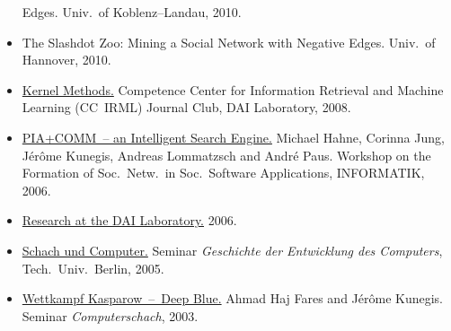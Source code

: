 \documentclass[line,mm]{res}
\newcounter{y}
\newcommand{\talknumber}{T\arabic{y}\stepcounter{y}}
\begin{document}
\begin{resume}
\begin{itemize}
    Edges. Univ.\ of Koblenz--Landau, 2010. 
  \item[{[\talknumber]}] The Slashdot Zoo: Mining a Social Network with Negative
    Edges. Univ.\ of Hannover, 2010. 
  \item[{[\talknumber]}]
    \href{https://github.com/kunegis/pdfs/blob/master/kunegis:kernels-club.presentation.pdf}{Kernel Methods.}
    Competence Center for Information Retrieval and Machine Learning (CC~IRML) Journal Club, DAI Laboratory, 2008. 
  \item[{[\talknumber]}] 
    \href{https://github.com/kunegis/pdfs/blob/master/hahne:gradualisiertes-communitymodell.presentation.pdf}{PIA+COMM~--
      an Intelligent Search Engine.} 
    Michael Hahne, Corinna Jung, Jérôme Kunegis, Andreas Lommatzsch and
    André Paus. 
    Workshop on the Formation of Soc.\ Netw.\ in Soc.\ Software
    Applications, INFORMATIK, 2006. 
  \item[{[\talknumber]}]
    \href{https://github.com/kunegis/pdfs/blob/master/kunegis:research-dai.presentation.pdf}{Research at the DAI Laboratory.}
    2006.
  \item[{[\talknumber]}]
    \href{https://www.slideshare.net/kunegis/schach-und-computer}{Schach und Computer.}
    Seminar \emph{Geschichte der Entwicklung des Computers}, Tech.\ Univ.\ Berlin, 2005.
  \item[{[\talknumber]}]
    \href{https://github.com/kunegis/pdfs/blob/master/kunegis:kasparow-deep-blue.presentation.pdf}{Wettkampf Kasparow~--\ Deep Blue.}
    Ahmad Haj Fares and Jérôme Kunegis.
    Seminar \emph{Computerschach}, 2003. 
\end{itemize}


\end{resume}
\end{document}
